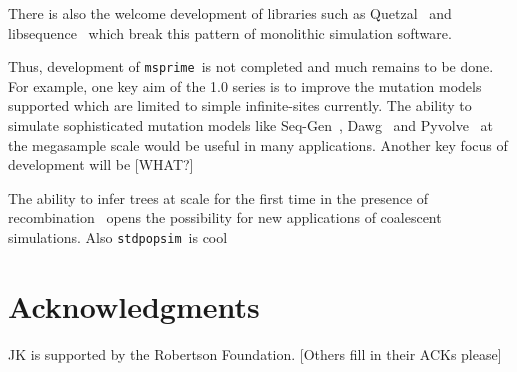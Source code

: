 \documentclass{article}
\newcommand{\msprime}[0]{\texttt{msprime}}
\newcommand{\stdpopsim}[0]{\texttt{stdpopsim}}
\begin{document}
There is also the welcome development of libraries such as
Quetzal~\citep{becheler2019quetzal} and libsequence~\citep{thornton2014cpp}
which break this pattern of monolithic simulation software.


Thus, development of \msprime\ is not completed and much remains
to be done. For example, one key aim of the 1.0 series is to
improve the mutation models supported which are limited to
simple infinite-sites currently. The ability to simulate
sophisticated mutation models like Seq-Gen~\citep{rambaut1997seq},
Dawg~\citep{cartwright2005dna} and Pyvolve~\citep{spielman2015pyvolve} at the megasample scale would be
useful in many applications. Another key focus of development
will be [WHAT?]

The ability to infer trees at scale for the first time
in the presence of
recombination~\citep{harris2019database,kelleher2019inferring,
speidel2019method,tang2019genealogy}
opens the possibility for new applications of coalescent simulations.
Also \stdpopsim\ is cool~\citep{adrion2019community}

\section*{Acknowledgments}
JK is supported by the Robertson Foundation. [Others fill in their ACKs please]



\end{document}

